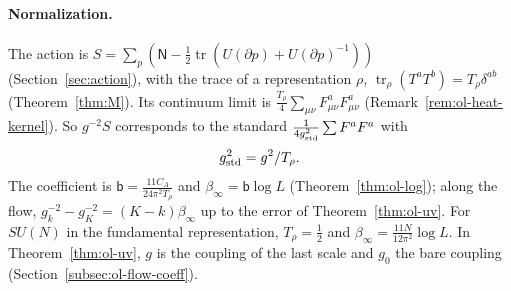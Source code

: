 

\paragraph{Normalization.} The action is $S=\sum_p(\mathsf N-\frac12\operatorname{tr}(U(\partial p)+U(\partial p)^{-1}))$ (Section~\ref{sec:action}), with the trace of a representation $\rho$, $\operatorname{tr}_\rho(T^aT^b)=T_\rho\delta^{ab}$ (Theorem~\ref{thm:M}). Its continuum limit is $\frac{T_\rho}4\sum_{\mu\nu}F^a_{\mu\nu}F^a_{\mu\nu}$ (Remark~\ref{rem:ol-heat-kernel}). So $g^{-2}S$ corresponds to the standard $\frac1{4g_{\rm std}^2}\sum F^aF^a$ with
\[
g_{\rm std}^2=g^2/T_\rho .
\]
The coefficient is $\mathsf b=\frac{11C_A}{24\pi^2T_\rho}$ and $\beta_\infty=\mathsf b\log L$ (Theorem~\ref{thm:ol-log}); along the flow, $g_k^{-2}-g_K^{-2}=(K-k)\beta_\infty$ up to the error of Theorem~\ref{thm:ol-uv}. For $SU(N)$ in the fundamental representation, $T_\rho=\frac12$ and $\beta_\infty=\frac{11N}{12\pi^2}\log L$. In Theorem~\ref{thm:ol-uv}, $g$ is the coupling of the last scale and $g_0$ the bare coupling (Section~\ref{subsec:ol-flow-coeff}).

